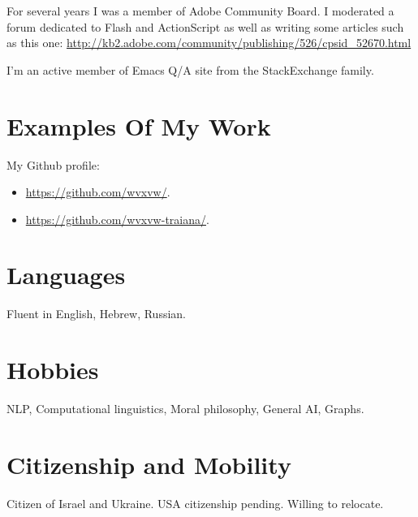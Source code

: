 \documentclass[11pt]{article}
\begin{document}
For several years I was a member of Adobe Community Board. I moderated a forum
dedicated to Flash and ActionScript as well as writing some articles such as
this one: \url{http://kb2.adobe.com/community/publishing/526/cpsid_52670.html}

I'm an active member of Emacs Q/A site from the StackExchange family.

\section*{Examples Of My Work}
\label{sec-5}
My Github profile:
\begin{itemize}
\item \url{https://github.com/wvxvw/}.
\item \url{https://github.com/wvxvw-traiana/}.
\end{itemize}

\section*{Languages}
\label{sec-6}
Fluent in English, Hebrew, Russian.

\section*{Hobbies}
\label{sec-7}
NLP, Computational linguistics, Moral philosophy, General AI, Graphs.

\section*{Citizenship and Mobility}
\label{sec-8}
Citizen of Israel and Ukraine.  USA citizenship pending.  Willing
to relocate.
\end{document}
